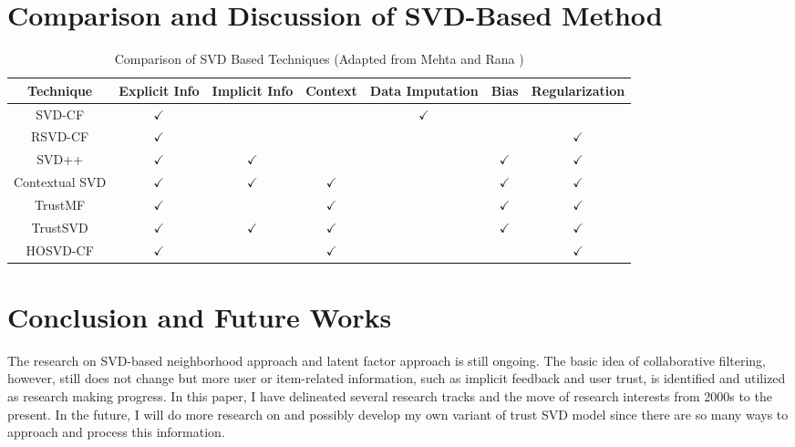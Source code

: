 \documentclass[letter paper, 11pt]{article}
\begin{document}
	
	\section{Comparison and Discussion of SVD-Based Method}


	\begin{table}[H]
		\centering
		\begin{tabular}{|c|c|c|c|c|c|c|}
			\hline
			Technique & Explicit Info & Implicit Info & Context & Data Imputation & Bias & Regularization \\ \hline
			SVD-CF & $\checkmark$ & & & $\checkmark$ &  &  \\ \hline
			RSVD-CF & $\checkmark$ & & & &  & $\checkmark$ \\ \hline
			SVD++ & $\checkmark$ & $\checkmark$ & & & $\checkmark$ & $\checkmark$ \\ \hline
			Contextual SVD \cite{contextual}& $\checkmark$ &$\checkmark$&$\checkmark$& & $\checkmark$ & $\checkmark$ \\ \hline
			TrustMF \cite{TrustMF}& $\checkmark$ & &$\checkmark$& & $\checkmark$ & $\checkmark$ \\ \hline
			TrustSVD & $\checkmark$ & $\checkmark$ & $\checkmark$ & & $\checkmark$ & $\checkmark$ \\ \hline
			HOSVD-CF \cite{tensor} & $\checkmark$ & & $\checkmark$ & & & $\checkmark$ \\ \hline
		\end{tabular}
		\caption{Comparison of SVD Based Techniques (Adapted from Mehta and Rana \cite{review})}
		\label{comparison}
	\end{table}
	
	
	\section{Conclusion and Future Works}

	The research on SVD-based neighborhood approach and latent factor approach is still ongoing. The basic idea of collaborative filtering, however, still does not change but more user or item-related information, such as implicit feedback and user trust, is identified and utilized as research making progress. In this paper, I have delineated several research tracks and the move of research interests from 2000s to the present. In the future, I will do more research on and possibly develop my own variant of trust SVD model since there are so many ways to approach and process this information. 

	
	
\end{document}

